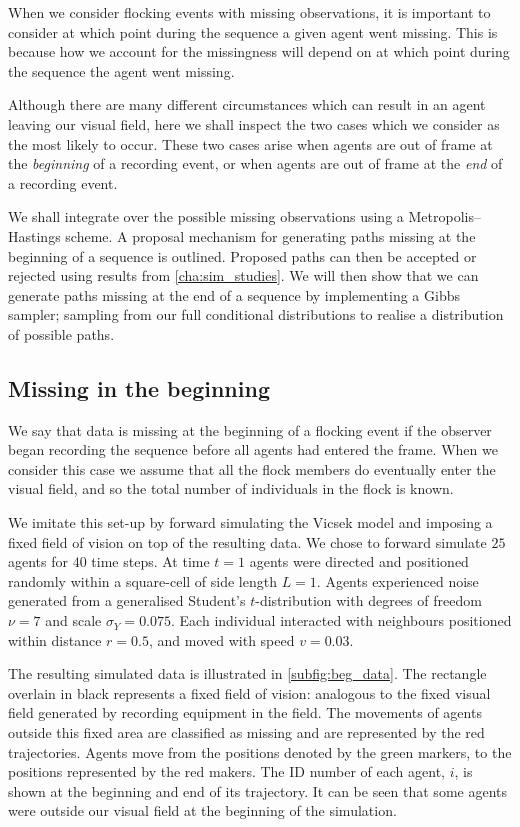 When we consider flocking events with missing observations, it is important to
consider at which point during the sequence a given agent went missing. This is
because how we account for the missingness will depend on at which point during
the sequence the agent went missing.

Although there are many different circumstances which can result in an agent
leaving our visual field, here we shall inspect the two cases which we
consider as the most likely to occur. These two cases arise when agents are
out of frame at the \emph{beginning} of a recording event, or when
agents are out of frame at the \emph{end} of a recording event.

We shall integrate over the possible missing observations using a
Metropolis--Hastings scheme. A proposal mechanism for generating paths missing
at the beginning of a sequence is outlined. Proposed paths can then be accepted
or rejected using results from \cref{cha:sim_studies}. We will then show that
we can generate paths missing at the end of a sequence by implementing a Gibbs
sampler; sampling from our full conditional distributions to realise a
distribution of possible paths.

\subsection{Missing in the beginning}
\label{ssec:beg_missing}

We say that data is missing at the beginning of a flocking event if the
observer began recording the sequence before all agents had entered the frame.
When we consider this case we assume that all the flock members do eventually
enter the visual field, and so the total number of individuals in the flock is
known.

We imitate this set-up by forward simulating the Vicsek model and imposing a
fixed field of vision on top of the resulting data. We chose to forward
simulate $25$ agents for $40$ time steps. At time $t=1$ agents were directed
and positioned randomly within a square-cell of side length $L=1$. Agents
experienced noise generated from a generalised Student's $t$-distribution with
degrees of freedom $\nu=7$ and scale $\sigma_Y=0.075$. Each individual
interacted with neighbours positioned within distance $r=0.5$, and moved with
speed $v=0.03$.

The resulting simulated data is illustrated in \cref{subfig:beg_data}. The
rectangle overlain in black represents a fixed field of vision: analogous to
the fixed visual field generated by recording equipment in the field. The
movements of agents outside this fixed area are classified as missing and are
represented by the red trajectories. Agents move from the positions denoted by
the green markers, to the positions represented by the red makers. The ID
number of each agent, $i$, is shown at the beginning and end of its trajectory.
It can be seen that some agents were outside our visual field at the beginning
of the simulation. 

